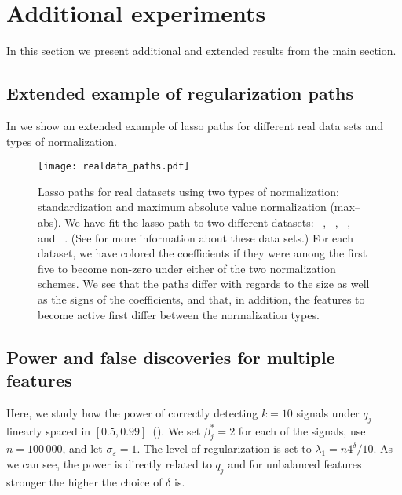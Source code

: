 \section{Additional experiments}

In this section we present additional and extended results from the main section.

\subsection{Extended example of regularization paths}%
\label{sec:extended-real-data-paths}

In  we show an extended example of lasso paths for different
real data sets and types of normalization.

\begin{figure}[hbpt]
  \centering
  \texttt{[image: realdata\_paths.pdf]}
  \caption{%
    Lasso paths for real datasets using two types of normalization:
    standardization and maximum absolute value normalization (max--abs). We have fit
    the lasso path to two different datasets:
    ~\citep{harrison1978}, ~\citep{golub1999},
    ~\citep{king1995,hirst1994}, and ~\citep{platt1998}. (See 
    for more information about these data sets.) For each
    dataset, we have colored the coefficients if they were among the first five
    to become non-zero under either of the two normalization schemes. We see
    that the paths differ with regards to the size as well as the signs of the
    coefficients, and that, in addition, the features to become active first
    differ between the normalization types.
  }
  \label{fig:realdata-paths-full}
\end{figure}

\subsection{Power and false discoveries for multiple features}%
\label{sec:power-fdr-multiple}

Here, we study how the power of correctly detecting \(k=10\) signals under \(q_j\) linearly
spaced in \([0.5, 0.99]\)~(). We set \(\beta^*_j = 2\) for each of
the signals, use \(n = 100\,000\), and let \(\sigma_\varepsilon = 1\). The level of
regularization is set to \(\lambda_1 = n 4^\delta/10\). As we can see, the power is
directly related to \(q_j\) and for unbalanced features stronger the higher the choice of
\(\delta\) is.

